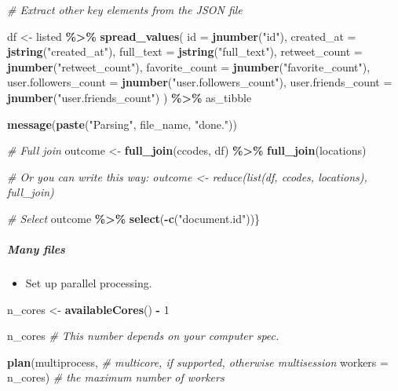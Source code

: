 \documentclass[
]{book}
\newenvironment{Shaded}{\begin{snugshade}}{\end{snugshade}}
\newcommand{\CommentTok}[1]{\textcolor[rgb]{0.56,0.35,0.01}{\textit{#1}}}
\newcommand{\DataTypeTok}[1]{\textcolor[rgb]{0.13,0.29,0.53}{#1}}
\newcommand{\DecValTok}[1]{\textcolor[rgb]{0.00,0.00,0.81}{#1}}
\newcommand{\KeywordTok}[1]{\textcolor[rgb]{0.13,0.29,0.53}{\textbf{#1}}}
\newcommand{\NormalTok}[1]{#1}
\newcommand{\OperatorTok}[1]{\textcolor[rgb]{0.81,0.36,0.00}{\textbf{#1}}}
\newcommand{\StringTok}[1]{\textcolor[rgb]{0.31,0.60,0.02}{#1}}
\providecommand{\tightlist}{%
  \setlength{\itemsep}{0pt}\setlength{\parskip}{0pt}}
\begin{document}
\begin{Shaded}
\begin{Highlighting}[]
\CommentTok{\# Extract other key elements from the JSON file}

\NormalTok{df \textless{}{-}}\StringTok{ }\NormalTok{listed }\OperatorTok{\%\textgreater{}\%}
\StringTok{  }\KeywordTok{spread\_values}\NormalTok{(}
    \DataTypeTok{id =} \KeywordTok{jnumber}\NormalTok{(}\StringTok{"id"}\NormalTok{),}
    \DataTypeTok{created\_at =} \KeywordTok{jstring}\NormalTok{(}\StringTok{"created\_at"}\NormalTok{),}
    \DataTypeTok{full\_text =} \KeywordTok{jstring}\NormalTok{(}\StringTok{"full\_text"}\NormalTok{),}
    \DataTypeTok{retweet\_count =} \KeywordTok{jnumber}\NormalTok{(}\StringTok{"retweet\_count"}\NormalTok{),}
    \DataTypeTok{favorite\_count =} \KeywordTok{jnumber}\NormalTok{(}\StringTok{"favorite\_count"}\NormalTok{),}
    \DataTypeTok{user.followers\_count =} \KeywordTok{jnumber}\NormalTok{(}\StringTok{"user.followers\_count"}\NormalTok{),}
    \DataTypeTok{user.friends\_count =} \KeywordTok{jnumber}\NormalTok{(}\StringTok{"user.friends\_count"}\NormalTok{)}
\NormalTok{  ) }\OperatorTok{\%\textgreater{}\%}
\StringTok{      }\NormalTok{as\_tibble}

\KeywordTok{message}\NormalTok{(}\KeywordTok{paste}\NormalTok{(}\StringTok{"Parsing"}\NormalTok{, file\_name, }\StringTok{"done."}\NormalTok{))}

\CommentTok{\# Full join}
\NormalTok{outcome \textless{}{-}}\StringTok{ }\KeywordTok{full\_join}\NormalTok{(ccodes, df) }\OperatorTok{\%\textgreater{}\%}\StringTok{ }\KeywordTok{full\_join}\NormalTok{(locations)}

\CommentTok{\# Or you can write this way: outcome \textless{}{-} reduce(list(df, ccodes, locations), full\_join)}

\CommentTok{\# Select}
\NormalTok{outcome }\OperatorTok{\%\textgreater{}\%}\StringTok{ }\KeywordTok{select}\NormalTok{(}\OperatorTok{{-}}\KeywordTok{c}\NormalTok{(}\StringTok{"document.id"}\NormalTok{))\}}
\end{Highlighting}
\end{Shaded}

\hypertarget{many-files}{%
\subparagraph{Many files}\label{many-files}}

\begin{itemize}
\tightlist
\item
  Set up parallel processing.
\end{itemize}

\begin{Shaded}
\begin{Highlighting}[]
\NormalTok{n\_cores \textless{}{-}}\StringTok{ }\KeywordTok{availableCores}\NormalTok{() }\OperatorTok{{-}}\StringTok{ }\DecValTok{1}

\NormalTok{n\_cores }\CommentTok{\# This number depends on your computer spec.}

\KeywordTok{plan}\NormalTok{(multiprocess, }\CommentTok{\# multicore, if supported, otherwise multisession}
     \DataTypeTok{workers =}\NormalTok{ n\_cores) }\CommentTok{\# the maximum number of workers}
\end{Highlighting}
\end{Shaded}
\end{document}
